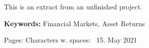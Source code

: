 \begin{titlepage}




This is an extract from an unfinished project. 

\begin{minipage}{1\textwidth}


\vspace{5mm}
\textbf{Keywords:} Financial Markets, Asset Returns
\end{minipage}

\vfill %


Pages: \pageref{LastPage} \qquad Characters w. spaces: \qquad
\makeatletter
\ 15. May 2021
\makeatother


\end{titlepage}